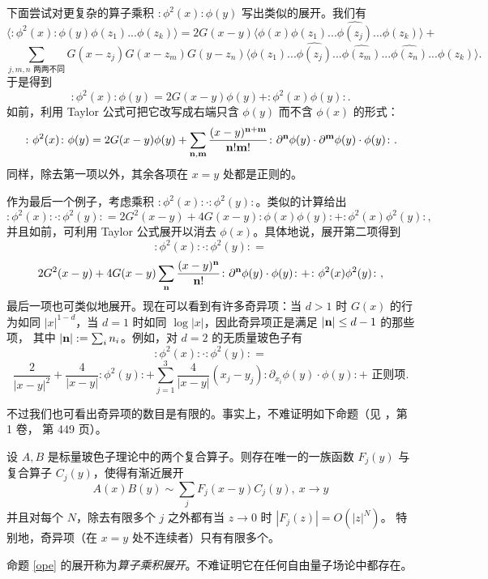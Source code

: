 下面尝试对更复杂的算子乘积 $\colon\phi^2(x)\colon \phi(y)$ 写出类似的展开。我们有
$$
\langle \colon\phi^2(x)\colon \phi(y)\phi(z_1)...\phi(z_k)\rangle=2G(x-y)\langle \phi(x)\phi(z_1)...\widehat{\phi(z_j)}...\phi(z_k)\rangle+
$$
$$
\sum_{j,m,n\text{ 两两不同}}G(x-z_j)G(x-z_m)G(y-z_n)\langle \phi(z_1)...\widehat{\phi(z_j)}...\widehat{\phi(z_m)}...\widehat{\phi(z_n)}...\phi(z_k)\rangle.
$$
于是得到
$$
\colon\phi^2(x)\colon \phi(y)=2G(x-y)\phi(y)+\colon \phi^2(x)\phi(y)\colon. 
$$
如前，利用 Taylor 公式可把它改写成右端只含 $\phi(y)$ 而不含 $\phi(x)$ 的形式：
$$
\colon\phi^2(x)\colon \phi(y)=2G(x-y)\phi(y)+\sum_{\bold n,\bold m}\frac{(x-y)^{\bold n+\bold m}}{\bold n!\bold m!}\colon \partial^{\bold n}\phi(y)\cdot \partial^{\bold m}\phi(y)\cdot \phi(y)\colon.
$$
同样，除去第一项以外，其余各项在 $x=y$ 处都是正则的。

作为最后一个例子，考虑乘积 $\colon\phi^2(x)\colon \cdot \colon\phi^2(y)\colon$。类似的计算给出
$$
\colon\phi^2(x)\colon \cdot \colon\phi^2(y)\colon =
2G^2(x-y)+4G(x-y)\colon \phi(x)\phi(y)\colon+\colon \phi^2(x)\phi^2(y)\colon, 
$$
并且如前，可利用 Taylor 公式展开以消去 $\phi(x)$。具体地说，展开第二项得到
$$
\colon\phi^2(x)\colon \cdot \colon\phi^2(y)\colon =
$$
$$
2G^2(x-y)+4G(x-y)\sum_{\bold n}\frac{(x-y)^{\bold n}}{\bold n!}\colon \partial^{\bold n}\phi(y)\cdot \phi(y)\colon+\colon \phi^2(x)\phi^2(y)\colon, 
$$
最后一项也可类似地展开。现在可以看到有许多奇异项：当 $d>1$ 时 $G(x)$ 的行为如同
$|x|^{1-d}$，当 $d=1$ 时如同 $\log|x|$，因此奇异项正是满足 $|\bold n|\le d-1$ 的那些项，
其中 $|\bold n|:=\sum_i n_i$。例如，对 $d=2$ 的无质量玻色子有
$$
\colon\phi^2(x)\colon \cdot \colon\phi^2(y)\colon =
$$
$$
\frac{2}{|x-y|^2}+\frac{4}{|x-y|}\colon \phi^2(y)\colon+\sum_{j=1}^3\frac{4}{|x-y|}(x_j-y_j)\colon \partial_{x_i}\phi(y)\cdot \phi(y)\colon+\text{ 正则项}.
$$

不过我们也可看出奇异项的数目是有限的。事实上，不难证明如下命题（见 \cite{QFS}，第 1 卷，
第 449 页）。

\begin{proposition}\label{ope} 设 $A,B$ 是标量玻色子理论中的两个复合算子。则存在唯一的一族函数
$F_j(y)$ 与复合算子 $C_j(y)$，使得有渐近展开
$$
A(x)B(y)\sim \sum_j F_j(x-y)C_j(y),\ x\to y 
$$
并且对每个 $N$，除去有限多个 $j$ 之外都有当 $z\to 0$ 时 $|F_j(z)|=O(|z|^N)$。
特别地，奇异项（在 $x=y$ 处不连续者）只有有限多个。
\end{proposition}  

命题 \ref{ope} 的展开称为\emph{算子乘积展开}。不难证明它在任何自由量子场论中都存在。

